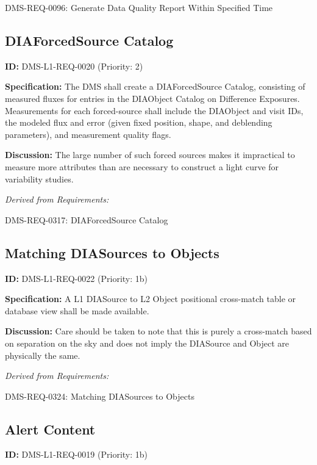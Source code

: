 \documentclass[SE,toc,lsstdraft]{lsstdoc}
\begin{document}
DMS-REQ-0096:
Generate Data Quality Report Within Specified Time \newline

\subsection{DIAForcedSource Catalog}

\label{DMS-L1-REQ-0020}
\textbf{ID:} DMS-L1-REQ-0020 (Priority: 2)

\textbf{Specification:} The DMS shall create a DIAForcedSource Catalog, consisting of measured fluxes for entries in the DIAObject Catalog on Difference Exposures. Measurements for each forced-source shall include the DIAObject and visit IDs, the modeled flux and error (given fixed position, shape, and deblending parameters), and measurement quality flags.

\textbf{Discussion: }The large number of such forced sources makes it impractical to measure more attributes than are necessary to construct a light curve for variability studies.

\emph{Derived from Requirements:}

DMS-REQ-0317:
DIAForcedSource Catalog \newline

\subsection{Matching DIASources to Objects}

\label{DMS-L1-REQ-0022}
\textbf{ID:} DMS-L1-REQ-0022 (Priority: 1b)

\textbf{Specification:} A L1 DIASource to L2 Object positional cross-match table or database view shall be made available.

\textbf{Discussion:} Care should be taken to note that this is purely a cross-match based on separation on the sky and does not imply the DIASource and Object are physically the same.

\emph{Derived from Requirements:}

DMS-REQ-0324:
Matching DIASources to Objects \newline

\subsection{Alert Content}

\label{DMS-L1-REQ-0019}
\textbf{ID:} DMS-L1-REQ-0019 (Priority: 1b)
\end{document}
